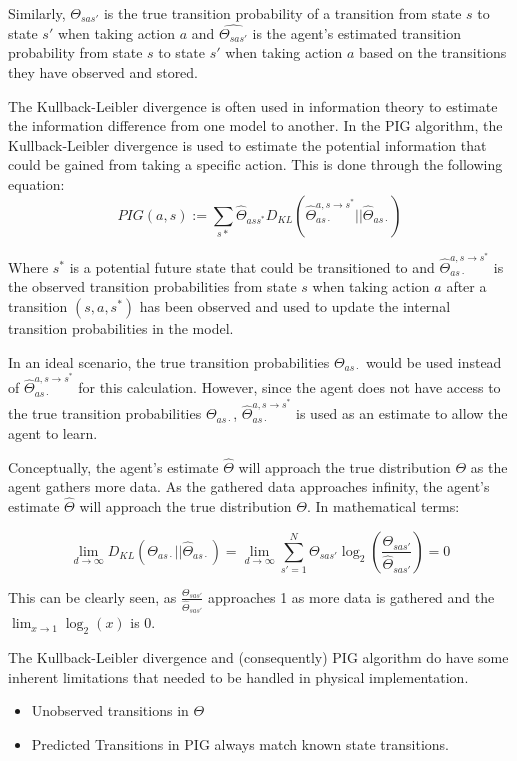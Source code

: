 \documentclass[12pt]{thesis}
\begin{document}
Similarly, $\Theta_{sas'}$ is the true transition probability of a transition from state $s$ to state $s'$ when taking action $a$ and $\hat{\Theta_{sas'}}$ is the agent's estimated transition probability from state $s$ to state $s'$ when taking action $a$ based on the transitions they have observed and stored.

The Kullback-Leibler divergence is often used in information theory to estimate the information difference from one model to another. In the PIG algorithm, the Kullback-Leibler divergence is used to estimate the potential information that could be gained from taking a specific action.
This is done through the following equation:
\[ PIG(a,s) := \sum_{s*} \hat{\Theta}_{ass^{*}}D_{KL}(\hat{\Theta}_{as\cdot}^{a,s \rightarrow s^{*}} || \hat{\Theta}_{as\cdot}) \]

Where $s^{*}$ is a potential future state that could be transitioned to and $\hat{\Theta}_{as\cdot}^{a,s \rightarrow s^{*}}$ is the observed transition probabilities from state $s$ when taking action $a$ after a transition $(s,a,s^{*})$ has been observed and used to update the internal transition probabilities in the model.

In an ideal scenario, the true transition probabilities $\Theta_{as\cdot}$ would be used instead of $\hat{\Theta}_{as\cdot}^{a,s \rightarrow s^{*}}$ for this calculation. However, since the agent does not have access to the true transition probabilities $\Theta_{as\cdot}$, $\hat{\Theta}_{as\cdot}^{a,s \rightarrow s^{*}}$ is used as an estimate to allow the agent to learn.

Conceptually, the agent's estimate $\hat{\Theta}$ will approach the true distribution $\Theta$ as the agent gathers more data. As the gathered data approaches infinity, the agent's estimate $\hat{\Theta}$ will approach the true distribution $\Theta$. In mathematical terms:

\[ \lim_{d \rightarrow \infty} D_{KL}( \Theta_{as\cdot} || \hat{\Theta}_{as\cdot}) = \lim_{d \rightarrow \infty} \sum_{s' = 1}^{ N} \Theta_{sas'} \log_{2}(\frac{\Theta_{sas'}}{\hat{\Theta}_{sas'}}) = 0\]

This can be clearly seen, as $\frac{\Theta_{sas'}}{\hat{\Theta}_{sas'}}$ approaches 1 as more data is gathered and the $\lim_{x \rightarrow 1} \log_{2}(x)$ is 0.

The Kullback-Leibler divergence and (consequently) PIG algorithm do have some inherent limitations that needed to be handled in physical implementation.
\begin{itemize}
	\item Unobserved transitions in $\Theta$
	\item Predicted Transitions in PIG always match known state transitions.
\end{itemize}
\end{document}

